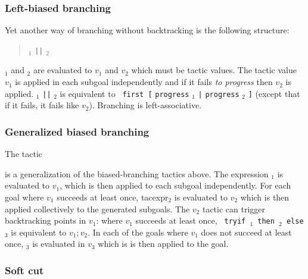 \ErrMsg {}

\subsubsection[Left-biased branching]{Left-biased branching\tacindex{$\mid\mid$}
}

Yet another way of branching without backtracking is the following structure:
\begin{quote}
{\tacexpr}$_1$ {\tt ||} {\tacexpr}$_2$
\end{quote}
{\tacexpr}$_1$ and {\tacexpr}$_2$ are evaluated to $v_1$ and
$v_2$ which must be tactic values. The tactic value $v_1$ is applied in each
subgoal independently and if it fails \emph{to progress} then $v_2$ is
applied. {\tacexpr}$_1$ {\tt ||} {\tacexpr}$_2$ is equivalent to {\tt
  first [} {\tt progress} {\tacexpr}$_1$ {\tt |} {\tt progress}
  {\tacexpr}$_2$ {\tt ]} (except that if it fails, it fails like
$v_2$). Branching is left-associative.

\subsubsection[Generalized biased branching]{Generalized biased branching
}

The tactic
\begin{quote}
{}
\end{quote}
is a generalization of the biased-branching tactics above. The
expression {\tacexpr}$_1$ is evaluated to $v_1$, which is then applied
to each subgoal independently. For each goal where $v_1$ succeeds at
least once, {tacexpr}$_2$ is evaluated to $v_2$ which is then applied
collectively to the generated subgoals. The $v_2$ tactic can trigger
backtracking points in $v_1$: where $v_1$ succeeds at least once, {\tt
  tryif {\tacexpr}$_1$ then {\tacexpr}$_2$ else {\tacexpr}$_3$} is
equivalent to $v_1;v_2$. In each of the goals where $v_1$ does not
succeed at least once, {\tacexpr}$_3$ is evaluated in $v_3$ which is
is then applied to the goal.

\subsubsection[Soft cut]{Soft cut}

